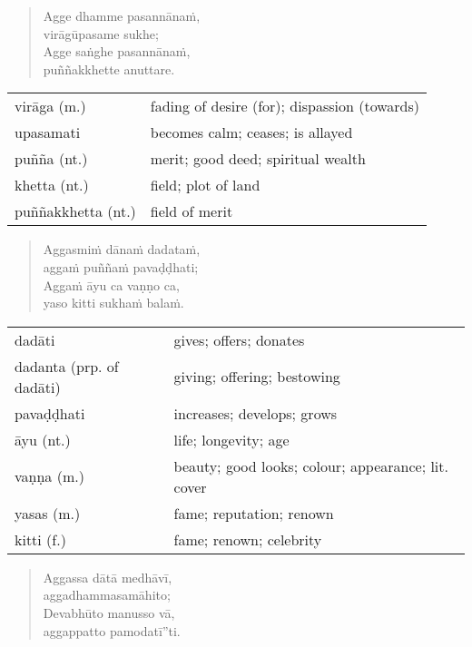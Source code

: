 \documentclass[11pt,oneside]{memoir}
\begin{document}
\clearpage

\begin{quote}
Agge dhamme pasannānaṁ, \\[0pt]
virāgūpasame sukhe; \\[0pt]
Agge saṅghe pasannānaṁ, \\[0pt]
puññakkhette anuttare.
\end{quote}

\begin{longtable}{L{\colOne} L{\colTwo}}
virāga (m.) & fading of desire (for); dispassion (towards)\\[0pt]
upasamati & becomes calm; ceases; is allayed\\[0pt]
puñña (nt.) & merit; good deed; spiritual wealth\\[0pt]
khetta (nt.) & field; plot of land\\[0pt]
puññakkhetta (nt.) & field of merit\\[0pt]
\end{longtable}

\begin{quote}
Aggasmiṁ dānaṁ dadataṁ, \\[0pt]
aggaṁ puññaṁ pavaḍḍhati; \\[0pt]
Aggaṁ āyu ca vaṇṇo ca, \\[0pt]
yaso kitti sukhaṁ balaṁ.
\end{quote}

\begin{longtable}{L{\colOne} L{\colTwo}}
dadāti & gives; offers; donates\\[0pt]
dadanta (prp. of dadāti) & giving; offering; bestowing\\[0pt]
pavaḍḍhati & increases; develops; grows\\[0pt]
āyu (nt.) & life; longevity; age\\[0pt]
vaṇṇa (m.) & beauty; good looks; colour; appearance; lit. cover\\[0pt]
yasas (m.) & fame; reputation; renown\\[0pt]
kitti (f.) & fame; renown; celebrity\\[0pt]
\end{longtable}

\clearpage

\begin{quote}
Aggassa dātā medhāvī, \\[0pt]
aggadhammasamāhito; \\[0pt]
Devabhūto manusso vā, \\[0pt]
aggappatto pamodatī”ti.
\end{quote}
\end{document}
